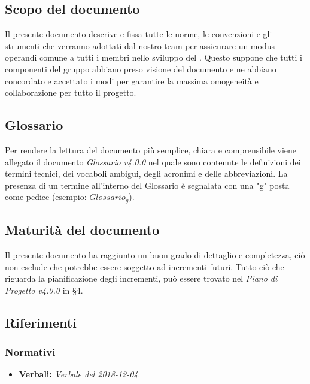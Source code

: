 \subsection{Scopo del documento}
Il presente documento descrive e fissa tutte le norme, le convenzioni e gli strumenti che verranno adottati dal nostro team per assicurare un modus operandi comune a tutti i membri nello sviluppo del . Questo suppone che tutti i componenti del gruppo abbiano preso visione del documento e ne abbiano concordato e accettato i modi per garantire la massima omogeneità e collaborazione per tutto il progetto.
\subsection{Glossario}
Per rendere la lettura del documento più semplice, chiara e comprensibile viene allegato il documento \emph{Glossario v4.0.0} nel quale sono contenute le definizioni dei termini tecnici, dei vocaboli ambigui, degli acronimi e delle abbreviazioni. La presenza di un termine all'interno del Glossario è segnalata con una "g" posta come pedice (esempio: $Glossario_{g}$).
\subsection{Maturità del documento}
Il presente documento ha raggiunto un buon grado di dettaglio e completezza, ciò non esclude che potrebbe essere soggetto ad incrementi futuri. Tutto ciò che riguarda la pianificazione degli incrementi, può essere trovato nel \emph{Piano di Progetto v4.0.0} in §4.
\subsection{Riferimenti}
\subsubsection{Normativi}
\begin{itemize}
	\item \textbf{Verbali:} \emph{Verbale del 2018-12-04}.
\end{itemize}
